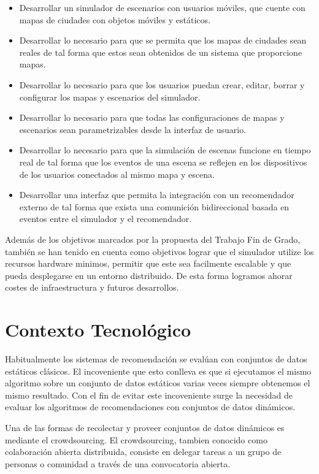 \begin{itemize}
	\item Desarrollar un simulador de escenarios con usuarios móviles, que cuente con mapas de ciudades con objetos móviles y estáticos.
	\item Desarrollar lo necesario para que se permita que los mapas de ciudades sean reales de tal forma que estos sean obtenidos de un sistema que proporcione mapas.
       \item Desarrollar lo necesario para que los usuarios puedan crear, editar, borrar y configurar los mapas y escenarios del simulador.
       \item Desarrollar lo necesario para que todas las configuraciones de mapas y escenarios sean parametrizables desde la interfaz de usuario.
       \item Desarrollar lo necesario para que la simulación de escenas funcione en tiempo real de tal forma que los eventos de una escena se reflejen en los dispositivos de los usuarios conectados al mismo mapa y escena.
       \item Desarrollar una interfaz que permita la integración con un recomendador externo de tal forma que exista una comunición bidireccional basada en eventos entre el simulador y el recomendador.
\end{itemize}

Además de los objetivos marcados por la propuesta del Trabajo Fin de Grado, también se han tenido en cuenta como objetivos lograr que el simulador utilize los recursos hardware minimos, permitir que este sea facilmente escalable y que pueda desplegarse en un entorno distribuido. De esta forma logramos ahorar costes de infraestructura y futuros desarrollos.

\section{Contexto Tecnológico}

Habitualmente los sistemas de recomendación se evalúan con conjuntos de datos estáticos clásicos. El incoveniente que esto conlleva es que si ejecutamos el mismo algoritmo sobre un conjunto de datos estáticos varias veces siempre obtenemos el mismo resultado. Con el fin de evitar este incoveniente surge la necesidad de evaluar los algoritmos de recomendaciones con conjuntos de datos dinámicos. 

Una de las formas de recolectar y proveer conjuntos de datos dinámicos es mediante el crowdsourcing. El crowdsourcing, tambien conocido como colaboración abierta distribuida, consiste en delegar tareas a un grupo de personas o comunidad a través de una convocatoria abierta. 

